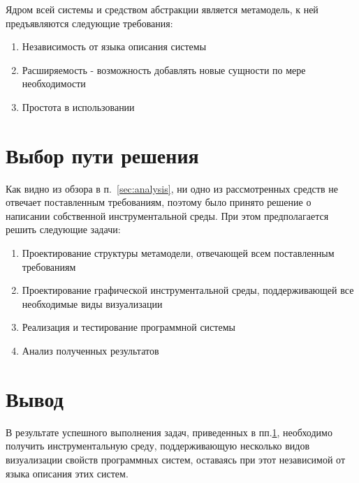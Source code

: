 Ядром всей системы и средством абстракции является метамодель, к ней
предъявляются следующие требования:

\begin{enumerate}
    \item Независимость от языка описания системы
    \item Расширяемость - возможность добавлять новые сущности по мере
    необходимости
    \item Простота в использовании
\end{enumerate}

\section{Выбор пути решения}
\label{sec:tasks}
Как видно из обзора в п.~\ref{sec:analysis}, ни одно из рассмотренных средств не
отвечает поставленным требованиям, поэтому было принято решение о написании
собственной инструментальной среды. При этом предполагается решить следующие
задачи:

\begin{enumerate}
    \item Проектирование структуры метамодели, отвечающей всем поставленным
    требованиям
    \item Проектирование графической инструментальной среды, поддерживающей все
    необходимые виды визуализации
    \item Реализация и тестирование программной системы
    \item Анализ полученных результатов
\end{enumerate}

\section{Вывод}
В результате успешного выполнения задач, приведенных в пп.\ref{sec:tasks},
необходимо получить инструментальную среду, поддерживающую несколько видов
визуализации свойств программных систем, оставаясь при этот независимой от
языка описания этих систем.

